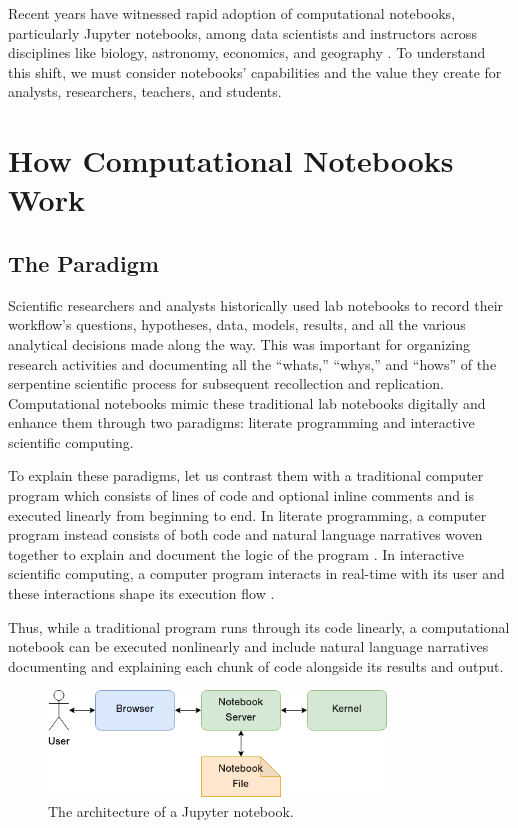 \documentclass[11pt,letterpaper]{article}
\begin{document}
Recent years have witnessed rapid adoption of computational notebooks, particularly Jupyter notebooks, among data scientists and instructors across disciplines like biology, astronomy, economics, and geography \citep{perkel_why_2018}. To understand this shift, we must consider notebooks' capabilities and the value they create for analysts, researchers, teachers, and students.

\section{How Computational Notebooks Work}

\subsection{The Paradigm}

Scientific researchers and analysts historically used lab notebooks to record their workflow's questions, hypotheses, data, models, results, and all the various analytical decisions made along the way. This was important for organizing research activities and documenting all the \enquote{whats,} \enquote{whys,} and \enquote{hows} of the serpentine scientific process for subsequent recollection and replication. Computational notebooks mimic these traditional lab notebooks digitally and enhance them through two paradigms: literate programming and interactive scientific computing.

To explain these paradigms, let us contrast them with a traditional computer program which consists of lines of code and optional inline comments and is executed linearly from beginning to end. In literate programming, a computer program instead consists of both code and natural language narratives woven together to explain and document the logic of the program \citep{knuth_literate_1992}. In interactive scientific computing, a computer program interacts in real-time with its user and these interactions shape its execution flow \citep{perez_ipython:_2007}.

Thus, while a traditional program runs through its code linearly, a computational notebook can be executed nonlinearly and include natural language narratives documenting and explaining each chunk of code alongside its results and output.

\begin{figure}[tbp]
	\centering
	\includegraphics[width=0.8\textwidth]{notebook-architecture.png}
	\caption{The architecture of a Jupyter notebook.}
	\label{fig:notebook_architecture}
\end{figure}
\end{document}
